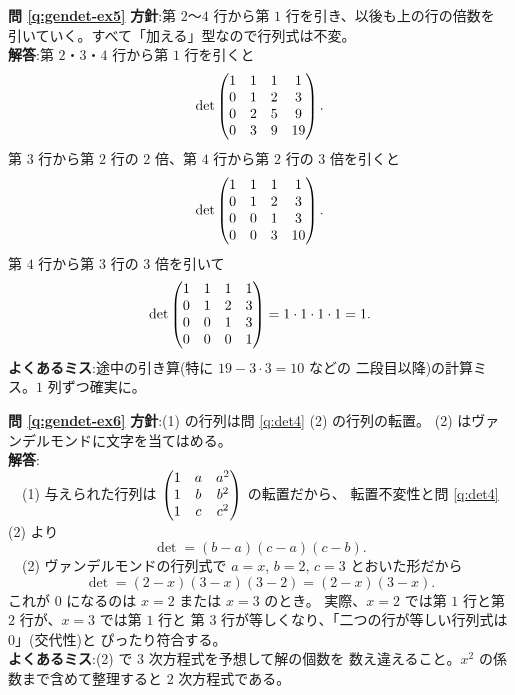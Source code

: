 \bigskip
\noindent\textbf{問 \ref{q:gendet-ex5}}\quad
\textbf{方針}:第 $2$〜$4$ 行から第 $1$ 行を引き、以後も上の行の倍数を
引いていく。すべて「加える」型なので行列式は不変。\\
\textbf{解答}:第 $2$・$3$・$4$ 行から第 $1$ 行を引くと
\[
\det \begin{pmatrix}1 & 1 & 1 & 1 \\ 0 & 1 & 2 & 3 \\ 0 & 2 & 5 & 9 \\ 0 & 3 & 9 & 19\end{pmatrix}.
\]
第 $3$ 行から第 $2$ 行の $2$ 倍、第 $4$ 行から第 $2$ 行の $3$ 倍を引くと
\[
\det \begin{pmatrix}1 & 1 & 1 & 1 \\ 0 & 1 & 2 & 3 \\ 0 & 0 & 1 & 3 \\ 0 & 0 & 3 & 10\end{pmatrix}.
\]
第 $4$ 行から第 $3$ 行の $3$ 倍を引いて
\[
\det \begin{pmatrix}1 & 1 & 1 & 1 \\ 0 & 1 & 2 & 3 \\ 0 & 0 & 1 & 3 \\ 0 & 0 & 0 & 1\end{pmatrix}
= 1 \cdot 1 \cdot 1 \cdot 1 = 1.
\]
\textbf{よくあるミス}:途中の引き算(特に $19 - 3 \cdot 3 = 10$ などの
二段目以降)の計算ミス。$1$ 列ずつ確実に。

\bigskip
\noindent\textbf{問 \ref{q:gendet-ex6}}\quad
\textbf{方針}:(1) の行列は問 \ref{q:det4} (2) の行列の転置。
(2) はヴァンデルモンドに文字を当てはめる。\\
\textbf{解答}:\\
　(1) 与えられた行列は
$\begin{pmatrix}1 & a & a^2 \\ 1 & b & b^2 \\ 1 & c & c^2\end{pmatrix}$ の転置だから、
転置不変性と問 \ref{q:det4} (2) より
\[
\det = (b - a)(c - a)(c - b).
\]
　(2) ヴァンデルモンドの行列式で $a = x$, $b = 2$, $c = 3$ とおいた形だから
\[
\det = (2 - x)(3 - x)(3 - 2) = (2 - x)(3 - x).
\]
これが $0$ になるのは $x = 2$ または $x = 3$ のとき。
実際、$x = 2$ では第 $1$ 行と第 $2$ 行が、$x = 3$ では第 $1$ 行と
第 $3$ 行が等しくなり、「二つの行が等しい行列式は $0$」(交代性)と
ぴったり符合する。\\
\textbf{よくあるミス}:(2) で $3$ 次方程式を予想して解の個数を
数え違えること。$x^2$ の係数まで含めて整理すると $2$ 次方程式である。

